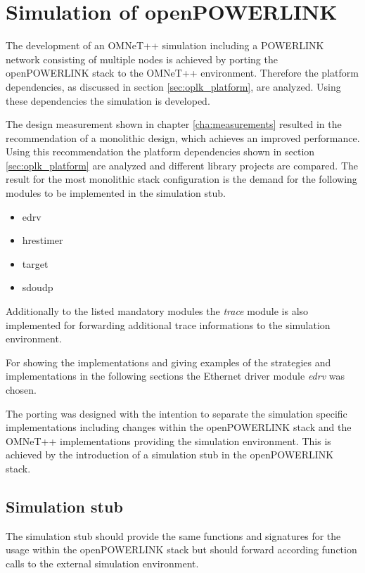 \chapter{Simulation of openPOWERLINK}
\label{cha:porting}
The development of an OMNeT++ simulation including a POWERLINK network consisting of multiple nodes is achieved by porting the openPOWERLINK stack to the OMNeT++ environment.
Therefore the platform dependencies, as discussed in section \ref{sec:oplk_platform}, are analyzed.
Using these dependencies the simulation is developed.

The design measurement shown in chapter \ref{cha:measurements} resulted in the recommendation of a monolithic design, which achieves an improved performance.
Using this recommendation the platform dependencies shown in section \ref{sec:oplk_platform} are analyzed and different library projects are compared.
The result for the most monolithic stack configuration is the demand for the following modules to be implemented in the simulation stub.

\begin{itemize}
    \item edrv
    \item hrestimer
    \item target
    \item sdoudp
\end{itemize}

Additionally to the listed mandatory modules the \emph{trace} module is also implemented for forwarding additional trace informations to the simulation environment.

For showing the implementations and giving examples of the strategies and implementations in the following sections the Ethernet driver module \emph{edrv} was chosen.

The porting was designed with the intention to separate the simulation specific implementations including changes within the openPOWERLINK stack and the OMNeT++ implementations providing the simulation environment.
This is achieved by the introduction of a simulation stub in the openPOWERLINK stack.

\section{Simulation stub}
\label{sec:porting_simstub}

The simulation stub should provide the same functions and signatures for the usage within the openPOWERLINK stack but should forward according function calls to the external simulation environment.

